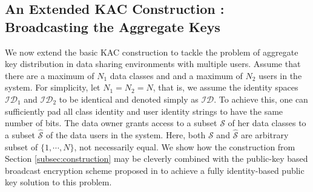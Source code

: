 \subsection{An Extended KAC Construction : Broadcasting the Aggregate Keys}
\label{subsec:multiuserKAC}

We now extend the basic KAC construction to tackle the problem of aggregate key distribution in data sharing environments with multiple users. Assume that there are a maximum of $N_1$ data classes and and a maximum of $N_2$ users in the system. For simplicity, let $N_1=N_2=N$, that is, we assume the identity spaces $\mathcal{ID}_1$ and $\mathcal{ID}_2$ to be identical and denoted simply as $\mathcal{ID}$. To achieve this, one can sufficiently pad all class identity and user identity strings to have the same number of bits. The data owner grants access to a subset $\mathcal{S}$ of her data classes to a subset $\hat{\mathcal{S}}$ of the data users in the system. Here, both $\mathcal{S}$ and $\hat{\mathcal{S}}$ are arbitrary subset of $\{1,\cdots,N\}$, not necessarily equal. We show how the construction from Section \ref{subsec:construction} may be cleverly combined with the public-key based broadcast encryption scheme proposed in \cite{boneh2014low} to achieve a fully identity-based public key solution to this problem. 
% 
